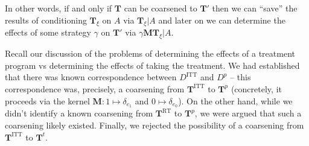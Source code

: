 In other words, if and only if $\mathbf{T}$ can be coarsened to $\mathbf{T}'$ then we can ``save'' the results of conditioning $\mathbf{T}_\xi$ on $A$ via $\mathbf{T}_\xi|A$ and later on we can determine the effects of some strategy $\gamma$ on $\mathbf{T}'$ via $\gamma \mathbf{M} \mathbf{T}_\xi|A$.

Recall our discussion of the problems of determining the effects of a treatment program vs determining the effects of taking the treatment. We had established that there was known correspondence between $D^{\mathrm{ITT}}$ and $D^p$ -- this correspondence was, precisely, a coarsening from $\mathbf{T}^{\mathrm{ITT}}$ to $\mathbf{T}^p$ (concretely, it proceeds via the kernel $\mathbf{M}:1\mapsto \delta_{e_1}$ and $0\mapsto \delta_{e_0}$). On the other hand, while we didn't identify a known coarsening from $\mathbf{T}^{\mathrm{RT}}$ to $\mathbf{T}^p$, we were argued that such a coarsening likely existed. Finally, we rejected the possibility of a coarsening from $\mathbf{T}^{\mathrm{ITT}}$ to $\mathbf{T}^t$.



